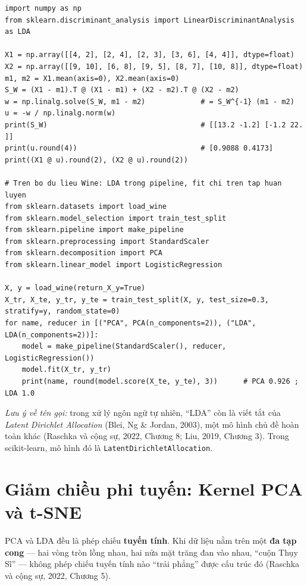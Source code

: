 \begin{lstlisting}[caption={LDA tính tay và LDA với scikit-learn}]
import numpy as np
from sklearn.discriminant_analysis import LinearDiscriminantAnalysis as LDA

X1 = np.array([[4, 2], [2, 4], [2, 3], [3, 6], [4, 4]], dtype=float)
X2 = np.array([[9, 10], [6, 8], [9, 5], [8, 7], [10, 8]], dtype=float)
m1, m2 = X1.mean(axis=0), X2.mean(axis=0)
S_W = (X1 - m1).T @ (X1 - m1) + (X2 - m2).T @ (X2 - m2)
w = np.linalg.solve(S_W, m1 - m2)             # = S_W^{-1} (m1 - m2)
u = -w / np.linalg.norm(w)
print(S_W)                                    # [[13.2 -1.2] [-1.2 22. ]]
print(u.round(4))                             # [0.9088 0.4173]
print((X1 @ u).round(2), (X2 @ u).round(2))

# Tren bo du lieu Wine: LDA trong pipeline, fit chi tren tap huan luyen
from sklearn.datasets import load_wine
from sklearn.model_selection import train_test_split
from sklearn.pipeline import make_pipeline
from sklearn.preprocessing import StandardScaler
from sklearn.decomposition import PCA
from sklearn.linear_model import LogisticRegression

X, y = load_wine(return_X_y=True)
X_tr, X_te, y_tr, y_te = train_test_split(X, y, test_size=0.3, stratify=y, random_state=0)
for name, reducer in [("PCA", PCA(n_components=2)), ("LDA", LDA(n_components=2))]:
    model = make_pipeline(StandardScaler(), reducer, LogisticRegression())
    model.fit(X_tr, y_tr)
    print(name, round(model.score(X_te, y_te), 3))      # PCA 0.926 ; LDA 1.0
\end{lstlisting}

\noindent\textit{Lưu ý về tên gọi:} trong xử lý ngôn ngữ tự nhiên, ``LDA'' còn là viết tắt của \textit{Latent Dirichlet Allocation} (Blei, Ng \& Jordan, 2003), một mô hình chủ đề hoàn toàn khác (Raschka và cộng sự, 2022, Chương 8; Liu, 2019, Chương 3). Trong scikit-learn, mô hình đó là \texttt{LatentDirichletAllocation}.

\section{Giảm chiều phi tuyến: Kernel PCA và t-SNE}
\label{sec:nonlinear-dr}

PCA và LDA đều là phép chiếu \textbf{tuyến tính}. Khi dữ liệu nằm trên một \textbf{đa tạp cong} --- hai vòng tròn lồng nhau, hai nửa mặt trăng đan vào nhau, ``cuộn Thụy Sĩ'' --- không phép chiếu tuyến tính nào ``trải phẳng'' được cấu trúc đó (Raschka và cộng sự, 2022, Chương 5).

